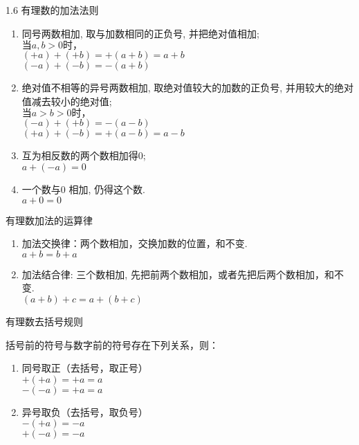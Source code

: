 \documentclass[aspectratio=169]{ctexbeamer} %
\date{\today}
\begin{document}
\begin{frame}[t]{1.6 有理数的加法法则}
\begin{spacing}{1.1} %
\normalsize
\begin{enumerate}[label={\arabic*.}]
\item 同号两数相加, 取与加数相同的正负号, 并把绝对值相加; \\
$\text{当}a,b  > 0\text{时，}$ \\
$(+a) + (+b) = +(a+b) = a + b$ \\
$(-a) + (-b) = -(a+b)$ \\
\item 绝对值不相等的异号两数相加, 取绝对值较大的加数的正负号, 并用较大的绝对值减去较小的绝对值; \\
$\text{当}a > b > 0\text{时，}$ \\
$(-a) + (+b) = -(a-b)$ \\
$(+a) + (-b) = +(a-b) = a - b$ \\
\item 互为相反数的两个数相加得0; \\
 $a + (-a) = 0$ \\
\item 一个数与0 相加, 仍得这个数. \\
$a + 0 = 0 $\\
\end{enumerate}
\end{spacing}
\end{frame}

\begin{frame}[t]{有理数加法的运算律}
\begin{spacing}{1.5} %
\Large
\begin{enumerate}[label={\arabic*.}]
\item 加法交换律：两个数相加，交换加数的位置，和不变. \\
$a + b = b + a$
\item 加法结合律: 三个数相加, 先把前两个数相加，或者先把后两个数相加，和不变. \\
$(a + b) + c = a + (b + c)$
\end{enumerate}
\end{spacing}
\end{frame}

\begin{frame}[t]{有理数去括号规则}
\begin{spacing}{1.2} %
\Large
括号前的符号与数字前的符号存在下列关系，则：
\begin{enumerate}[label={\arabic*.}]
\item 同号取正（去括号，取正号） \\
$+(+a) = +a = a$ \\
$-(-a) = +a = a$ 
\item 异号取负（去括号，取负号）\\
$-(+a) = -a$ \\
$+(-a) = -a$ \\
\end{enumerate}
\end{spacing}
\end{frame}
\end{document}
